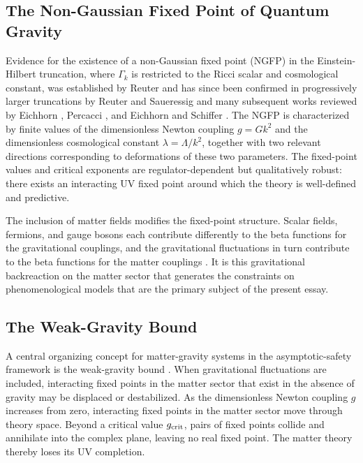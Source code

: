 \documentclass[12pt,a4paper]{article}
\begin{document}
\subsection{The Non-Gaussian Fixed Point of Quantum Gravity}

Evidence for the existence of a non-Gaussian fixed point (NGFP) in the
Einstein-Hilbert truncation, where $\Gamma_k$ is restricted to the Ricci
scalar and cosmological constant, was established by Reuter \cite{Reuter1998}
and has since been confirmed in progressively larger truncations by Reuter and
Saueressig \cite{ReuterSaueressig2012} and many subsequent works reviewed by
Eichhorn \cite{Eichhorn2019}, Percacci \cite{Percacci2017}, and Eichhorn and
Schiffer \cite{EichhornSchiffer2022handbook}. The NGFP is characterized by
finite values of the dimensionless Newton coupling $g = Gk^2$ and the
dimensionless cosmological constant $\lambda = \Lambda/k^2$, together with
two relevant directions corresponding to deformations of these two parameters.
The fixed-point values and critical exponents are regulator-dependent but
qualitatively robust: there exists an interacting UV fixed point around which
the theory is well-defined and predictive.

The inclusion of matter fields modifies the fixed-point structure. Scalar
fields, fermions, and gauge bosons each contribute differently to the beta
functions for the gravitational couplings, and the gravitational fluctuations
in turn contribute to the beta functions for the matter couplings
\cite{Eichhorn2022status,EichhornSchiffer2022handbook}. It is this
gravitational backreaction on the matter sector that generates the constraints
on phenomenological models that are the primary subject of the present essay.

\subsection{The Weak-Gravity Bound}

A central organizing concept for matter-gravity systems in the
asymptotic-safety framework is the weak-gravity bound
\cite{EichhornSchiffer2022handbook}. When gravitational fluctuations are
included, interacting fixed points in the matter sector that exist in the
absence of gravity may be displaced or destabilized. As the dimensionless
Newton coupling $g$ increases from zero, interacting fixed points in the matter
sector move through theory space. Beyond a critical value $g_{\rm crit}$, pairs
of fixed points collide and annihilate into the complex plane, leaving no real
fixed point. The matter theory thereby loses its UV completion.
\end{document}
